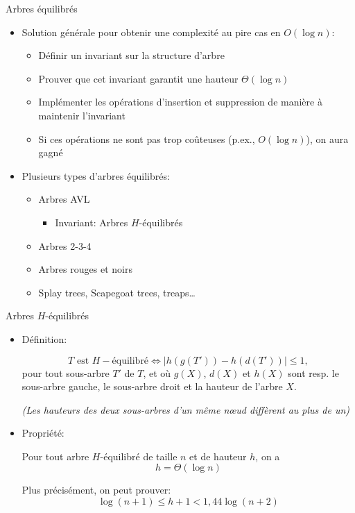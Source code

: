 \begin{frame}{Arbres équilibrés}
\begin{itemize}
\item Solution générale pour obtenir une complexité au pire cas en $O(\log n)$:%
\begin{itemize}
\item Définir un \alert{invariant} sur la structure d'arbre
\item Prouver que cet invariant garantit une hauteur $\Theta(\log n)$
\item Implémenter les opérations d'insertion et suppression de manière à maintenir l'invariant
\item Si ces opérations ne sont pas trop coûteuses (p.ex., $O(\log
  n)$), on aura gagné
\end{itemize}

\bigskip

\item Plusieurs types d'arbres équilibrés:
\begin{itemize}
\item \alert{Arbres AVL}
\begin{itemize}
\item \alert{Invariant: Arbres $H$-équilibrés}
\end{itemize}
\item Arbres 2-3-4
\item Arbres rouges et noirs
\item Splay trees, Scapegoat trees, treaps\ldots
\end{itemize}
\end{itemize}
\end{frame}

\begin{frame}{Arbres $H$-équilibrés}
\begin{itemize}
\item \alert{Définition:}

$$T\mbox{ est }H-\mbox{équilibré}\Leftrightarrow |h(g(T'))-h(d(T'))|\leq 1,$$
pour tout sous-arbre $T'$ de $T$, et où $g(X)$, $d(X)$ et $h(X)$ sont resp. le sous-arbre gauche, le sous-arbre droit et la hauteur de l'arbre $X$.

\medskip

\emph{(Les hauteurs des deux sous-arbres d'un même n\oe ud diffèrent au plus de un)}

\bigskip

\item \alert{Propriété:}

Pour tout arbre $H$-équilibré de taille $n$ et de hauteur $h$, on a 
$$h=\Theta(\log n)$$

Plus précisément, on peut prouver:
 $$\log(n+1)\leq h+1< 1,44 \log(n+2)$$
\end{itemize}

\end{frame}

